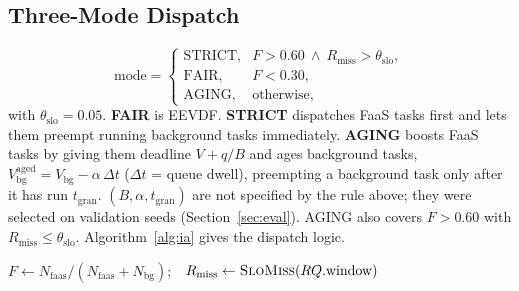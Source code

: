 \documentclass[journal]{IEEEtran}
\begin{document}
\subsection{Three-Mode Dispatch}
\begin{equation}
\text{mode}=\begin{cases}
\text{STRICT}, & F>0.60\ \wedge\ R_{\mathrm{miss}}>\theta_{\mathrm{slo}},\\
\text{FAIR}, & F<0.30,\\
\text{AGING}, & \text{otherwise},
\end{cases}
\end{equation}
with $\theta_{\mathrm{slo}}=0.05$. \textbf{FAIR} is EEVDF. \textbf{STRICT} dispatches FaaS tasks first and lets them preempt running background tasks immediately. \textbf{AGING} boosts FaaS tasks by giving them deadline $V+q/B$ and ages background tasks, $V^{\mathrm{aged}}_{\mathrm{bg}}=V_{\mathrm{bg}}-\alpha\,\Delta t$ ($\Delta t$ = queue dwell), preempting a background task only after it has run $t_{\mathrm{gran}}$. $(B,\alpha,t_{\mathrm{gran}})$ are not specified by the rule above; they were selected on validation seeds (Section~\ref{sec:eval}). AGING also covers $F>0.60$ with $R_{\mathrm{miss}}\le\theta_{\mathrm{slo}}$. Algorithm~\ref{alg:ia} gives the dispatch logic.

\begin{algorithm}[t]
\caption{IA-SchedExt dispatch state machine}\label{alg:ia}
$F\leftarrow N_{\mathrm{faas}}/(N_{\mathrm{faas}}+N_{\mathrm{bg}})$;\ \ $R_{\mathrm{miss}}\leftarrow \textsc{SloMiss}(RQ.\mathrm{window})$\;
\end{algorithm}
\end{document}

